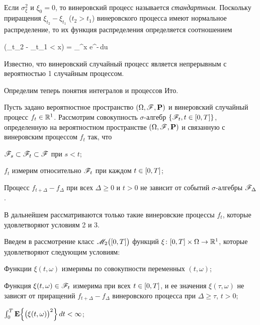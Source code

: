 Если $\sigma_\xi^2$ и $\xi_0 = 0$, то винеровский процесс называется \emph{стандартным}. Поскольку приращения $\xi_{t_2} - \xi_{t_1}$ ($t_2 > t_1$) винеровского процесса имеют нормальное распределение, то их функция распределения определяется соотношением

\beqn
    \prob(\xi_{t_2} - \xi_{t_1} < x) =  \int\limits_\infty^x e^{-}\,du 
\eeqn

Известно, что винеровский случайный процесс является непрерывным с вероятностью 1 случайным процессом.

\br

Определим теперь понятия интегралов и процессов Ито.

Пусть задано вероятностное пространство $(\Omega, \mathscr{F}, \mathbf{P})$ и винеровский случайный процесс $f_t \in \mathbb{R}^{1}$. Рассмотрим совокупность $\sigma$-алгебр $\{ \mathscr{F}_t, t \in [0, T] \}$, определенную на вероятностном пространстве $(\Omega, \mathscr{F}, \mathbf{P})$ и связанную с винеровским процессом $f_t$ так, что

\benum
    \item
        $\mathscr{F}_s \subset \mathscr{F}_t \subset \mathscr{F}$ при $s<t$;

    \item
        $f_t$ измерим относительно $\mathscr{F}_t$ при каждом $t \in [0, T]$;

    \item
        Процесс $f_{t+\Delta} - f_\Delta$ при всех $\Delta \geqslant 0$ и $t > 0$ не зависит от событий $\sigma$-алгебры $\mathscr{F}_\Delta$.
\eenum

В дальнейшем рассматриваются только такие винеровские процессы $f_t$, которые удовлетворяют условиям 2 и 3.

Введем в рассмотрение класс $\mathscr{M}_2\bigl( [0, T] \bigr)$ функций $\xi \colon [0, T] \times \Omega \to \mathbb{R}^{1}$, которые удовлетворяют следующим условиям:

\benum
    \item
        Функции $\xi(t, \omega)$ измеримы по совокупности переменных $(t, \omega)$;

    \item
        Функция $\xi(t, \omega) \in \mathscr{F}_t$ измерима при всех $t \in [0, T]$, и ее значения $\xi(\tau, \omega)$ не зависят от приращений $f_{t+\Delta} - f_\Delta$ винеровского процесса при $\Delta \geqslant \tau$, $t > 0$;

    \item
        $\int_0^T \mathbf{E} \Bigl\{ \bigl( \xi(t, \omega) \bigr)^2 \Bigr\}\,dt < \infty$;

